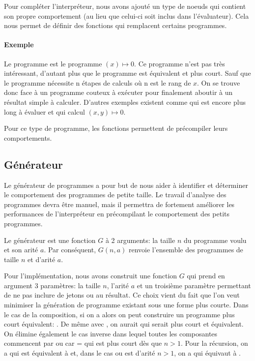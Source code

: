 \documentclass[a4paper, 11pt]{article}
\begin{document}
Pour compléter l'interpréteur, nous avons ajouté un type de noeuds
qui contient son propre comportement (au lieu que celui-ci soit inclus dans
l'évaluateur). 
Cela nous permet de définir des fonctions qui remplacent certains programmes.

\paragraph{Exemple} Le programme  est le programme $(x) \mapsto 0$.
Ce programme n'est pas très intéressant, d'autant plus que le programme  
est équivalent et plus court. Sauf que le programme  nécessite n étapes
de calculs où n est le rang de $x$. On se trouve donc face à un programme couteux à exécuter
pour finalement aboutir à un résultat simple à calculer.
D'autres exemples existent comme  qui est encore plus long à évaluer
et qui calcul $(x, y) \mapsto 0$.

Pour ce type de programme, les fonctions permettent de précompiler leurs comportements.

\subsection{Générateur}

Le générateur de programmes a pour but de nous aider à identifier et 
déterminer le comportement des programmes de petite taille. Le travail 
d'analyse des programmes devra être manuel, mais il permettra de fortement
améliorer les performances de l'interpréteur en précompilant le comportement
des petits programmes.

Le générateur est une fonction $G$ à 2 arguments: la taille $n$ du programme 
voulu et son arité $a$. Par conséquent, $G(n, a)$ renvoie l'ensemble des 
programmes de taille $n$ et d'arité $a$.

\def\fprime{\mbox{\scriptsize\bfseries $f'$}}
\def\gnmoinsun{\mbox{\scriptsize\bfseries $g_{n\text{-}1}$}}

Pour l'implémentation, nous avons construit une fonction $G$ qui prend en argument
3 paramètres: la taille $n$, l'arité $a$ et un troisième paramètre permettant de
ne pas inclure de jetons \progS{<} ou \progS{>} au résultat. Ce choix vient du 
fait que l'on veut minimiser la génération de programme existant sous une forme
plus courte. Dans le cas de la composition, si on a 
alors on peut construire un programme plus court équivalent:
. De même avec , on aurait
\progS{o!f!\gone!\dots!\gnmoinsun} qui serait plus court et équivalent.
On élimine également le cas inverse dans lequel toutes les composantes commencent
par \progS{<} ou \progS{>} car  = 
qui est plus court dès que $n > 1$.
Pour la récursion, on a  qui est équivalent à  et,
dans le cas ou  est d'arité $n > 1$, on a  qui équivaut à
.
\end{document}
